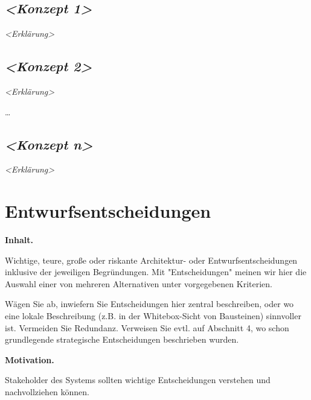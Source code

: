 \documentclass[]{article}
\begin{document}
\hypertarget{__emphasis_konzept_1_emphasis}{%
\subsection{\texorpdfstring{\emph{\textless{}Konzept
1\textgreater{}}}{\textless{}Konzept 1\textgreater{}}}\label{__emphasis_konzept_1_emphasis}}

\emph{\textless{}Erklärung\textgreater{}}

\hypertarget{__emphasis_konzept_2_emphasis}{%
\subsection{\texorpdfstring{\emph{\textless{}Konzept
2\textgreater{}}}{\textless{}Konzept 2\textgreater{}}}\label{__emphasis_konzept_2_emphasis}}

\emph{\textless{}Erklärung\textgreater{}}

\ldots{}

\hypertarget{__emphasis_konzept_n_emphasis}{%
\subsection{\texorpdfstring{\emph{\textless{}Konzept
n\textgreater{}}}{\textless{}Konzept n\textgreater{}}}\label{__emphasis_konzept_n_emphasis}}

\emph{\textless{}Erklärung\textgreater{}}

\hypertarget{section-design-decisions}{%
\section{Entwurfsentscheidungen}\label{section-design-decisions}}

\textbf{Inhalt.}

Wichtige, teure, große oder riskante Architektur- oder
Entwurfsentscheidungen inklusive der jeweiligen Begründungen. Mit
"Entscheidungen" meinen wir hier die Auswahl einer von mehreren
Alternativen unter vorgegebenen Kriterien.

Wägen Sie ab, inwiefern Sie Entscheidungen hier zentral beschreiben,
oder wo eine lokale Beschreibung (z.B. in der Whitebox-Sicht von
Bausteinen) sinnvoller ist. Vermeiden Sie Redundanz. Verweisen Sie evtl.
auf Abschnitt 4, wo schon grundlegende strategische Entscheidungen
beschrieben wurden.

\textbf{Motivation.}

Stakeholder des Systems sollten wichtige Entscheidungen verstehen und
nachvollziehen können.
\end{document}

